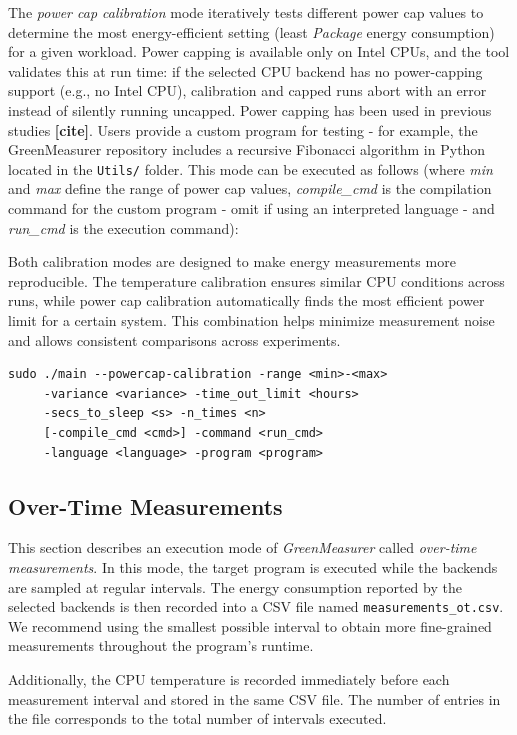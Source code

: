 The \textit{power cap calibration} mode iteratively tests different power cap values to determine the most energy-efficient setting (least \textit{Package} energy consumption) for a given workload. Power capping is available only on Intel CPUs, and the tool validates this at run time: if the selected CPU backend has no power-capping support (e.g., no Intel CPU), calibration and capped runs abort with an error instead of silently running uncapped. Power capping has been used in previous studies \textbf{[cite]}. Users provide a custom program for testing - for example, the GreenMeasurer repository includes a recursive Fibonacci algorithm in Python located in the \texttt{Utils/} folder. This mode can be executed as follows (where \textit{min} and \textit{max} define the range of power cap values, \textit{compile\_cmd} is the compilation command for the custom program - omit if using an interpreted language - and \textit{run\_cmd} is the execution command):

Both calibration modes are designed to make energy measurements more reproducible. The temperature calibration ensures similar CPU conditions across runs, while power cap calibration automatically finds the most efficient power limit for a certain system. This combination helps minimize measurement noise and allows consistent comparisons across experiments.

\begin{verbatim}
sudo ./main --powercap-calibration -range <min>-<max>
     -variance <variance> -time_out_limit <hours>
     -secs_to_sleep <s> -n_times <n>
     [-compile_cmd <cmd>] -command <run_cmd>
     -language <language> -program <program>
\end{verbatim}


\subsection{Over-Time Measurements}
\label{overtime_section}

This section describes an execution mode of \textit{GreenMeasurer} called \textit{over-time measurements}. In this mode, the target program is executed while the backends are sampled at regular intervals. The energy consumption reported by the selected backends is then recorded into a CSV file named \texttt{measurements\_ot.csv}. We recommend using the smallest possible interval to obtain more fine-grained measurements throughout the program's runtime.

Additionally, the CPU temperature is recorded immediately before each measurement interval and stored in the same CSV file. The number of entries in the file corresponds to the total number of intervals executed.

